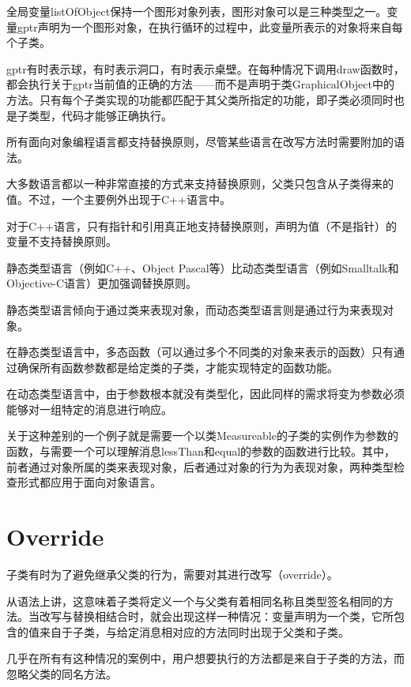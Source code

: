 全局变量listOfObject保持一个图形对象列表，图形对象可以是三种类型之一。变量gptr声明为一个图形对象，在执行循环的过程中，此变量所表示的对象将来自每个子类。

gptr有时表示球，有时表示洞口，有时表示桌壁。在每种情况下调用draw函数时，都会执行关于gptr当前值的正确的方法——而不是声明于类GraphicalObject中的方法。只有每个子类实现的功能都匹配于其父类所指定的功能，即子类必须同时也是子类型，代码才能够正确执行。

所有面向对象编程语言都支持替换原则，尽管某些语言在改写方法时需要附加的语法。

大多数语言都以一种非常直接的方式来支持替换原则，父类只包含从子类得来的值。不过，一个主要例外出现于C++语言中。

对于C++语言，只有指针和引用真正地支持替换原则，声明为值（不是指针）的变量不支持替换原则。

静态类型语言（例如C++、Object Pascal等）比动态类型语言（例如Smalltalk和Objective-C语言）更加强调替换原则。

静态类型语言倾向于通过类来表现对象，而动态类型语言则是通过行为来表现对象。


\begin{compactitem}
\item 在静态类型语言中，多态函数（可以通过多个不同类的对象来表示的函数）只有通过确保所有函数参数都是给定类的子类，才能实现特定的函数功能。
\item 在动态类型语言中，由于参数根本就没有类型化，因此同样的需求将变为参数必须能够对一组特定的消息进行响应。
\end{compactitem}

关于这种差别的一个例子就是需要一个以类Measureable的子类的实例作为参数的函数，与需要一个可以理解消息lessThan和equal的参数的函数进行比较。其中，前者通过对象所属的类来表现对象，后者通过对象的行为为表现对象，两种类型检查形式都应用于面向对象语言。

\section{Override}

子类有时为了避免继承父类的行为，需要对其进行改写（override）。

从语法上讲，这意味着子类将定义一个与父类有着相同名称且类型签名相同的方法。当改写与替换相结合时，就会出现这样一种情况：变量声明为一个类，它所包含的值来自于子类，与给定消息相对应的方法同时出现于父类和子类。

几乎在所有有这种情况的案例中，用户想要执行的方法都是来自于子类的方法，而忽略父类的同名方法。

